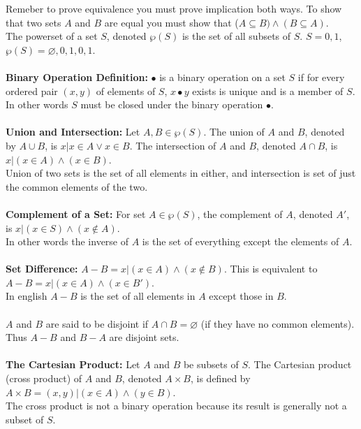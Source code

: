 \documentclass[14pt]{extreport}
\begin{document}
Remeber to prove equivalence you must prove implication both ways. To show that two sets $A$ and $B$ are equal you must show that ($A \subseteq B) \land (B \subseteq A)$.\\

The powerset of a set $S$, denoted $\wp(S)$ is the set of all subsets of $S$. $S = {0,1}$, $\wp(S) = {\varnothing, {0}, {1}, {0, 1}}$.\\\\

\textbf{Binary Operation Definition: }$\bullet$ is a binary operation on a set $S$ if for every ordered pair $(x, y)$ of elements of $S$, $x \bullet y$ exists is unique and is a member of $S$.\\
In other words $S$ must be closed under the binary operation $\bullet$.\\\\

\textbf{Union and Intersection: } Let $A,B \in \wp(S)$. The union of $A$ and $B$, denoted by $A \cup B$, is {$x | x \in A \lor x \in B$}. The intersection of $A$ and $B$, denoted $A \cap B$, is {$x | (x \in A) \land (x \in B)$}.\\
Union of two sets is the set of all elements in either, and intersection is set of just the common elements of the two.\\\\

\textbf{Complement of a Set: }For set $A \in \wp(S)$, the complement of $A$, denoted $A'$, is {$x | (x \in S) \land (x \notin A)$}.\\
In other words the inverse of $A$ is the set of everything except the elements of $A$.\\\\

\textbf{Set Difference:} $A-B = ${$x | (x \in A) \land (x \notin B)$}. This is equivalent to $A-B = {x | (x \in A) \land (x \in B')}$.\\
In english $A-B$ is the set of all elements in $A$ except those in $B$.\\\\

$A$ and $B$ are said to be disjoint if $A \cap B = \varnothing$ (if they have no common elements). Thus $A - B$ and $B - A$ are disjoint sets.\\\\

\textbf{The Cartesian Product: }Let $A$ and $B$ be subsets of $S$. The Cartesian product (cross product) of $A$ and $B$, denoted $A \times B$, is defined by\\
$A \times B = { (x,y) | (x \in A) \land (y \in B)}$.\\
The cross product is not a binary operation because its result is generally not a subset of $S$.\\\\
\end{document}
